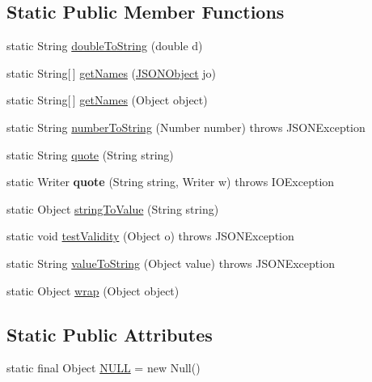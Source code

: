 \subsection*{Static Public Member Functions}
\begin{DoxyCompactItemize}
\item 
static String \hyperlink{classorg_1_1json_1_1JSONObject_aad3ea50c3546331486737bcb24e42460}{double\-To\-String} (double d)
\item 
static String\mbox{[}$\,$\mbox{]} \hyperlink{classorg_1_1json_1_1JSONObject_a30d4e44e4c8e03341c346970a00ba283}{get\-Names} (\hyperlink{classorg_1_1json_1_1JSONObject}{J\-S\-O\-N\-Object} jo)
\item 
static String\mbox{[}$\,$\mbox{]} \hyperlink{classorg_1_1json_1_1JSONObject_acf2ec104b4cbbf2947b155d54047efe8}{get\-Names} (Object object)
\item 
static String \hyperlink{classorg_1_1json_1_1JSONObject_a5ea1eb29e2e3bdc7b4fae0579ead8525}{number\-To\-String} (Number number)  throws J\-S\-O\-N\-Exception 
\item 
static String \hyperlink{classorg_1_1json_1_1JSONObject_abe60222a3919d3f88f104486c1ef13fe}{quote} (String string)
\item 
\hypertarget{classorg_1_1json_1_1JSONObject_aac3d22e558d472049d4c8702cdaf676a}{static Writer {\bfseries quote} (String string, Writer w)  throws I\-O\-Exception }\label{classorg_1_1json_1_1JSONObject_aac3d22e558d472049d4c8702cdaf676a}

\item 
static Object \hyperlink{classorg_1_1json_1_1JSONObject_a23f861897abe58eb41c044dd63667319}{string\-To\-Value} (String string)
\item 
static void \hyperlink{classorg_1_1json_1_1JSONObject_a406920be130176bad74d605bae04a6da}{test\-Validity} (Object o)  throws J\-S\-O\-N\-Exception 
\item 
static String \hyperlink{classorg_1_1json_1_1JSONObject_ab386b6f594205eecdbe023ad7cb26105}{value\-To\-String} (Object value)  throws J\-S\-O\-N\-Exception 
\item 
static Object \hyperlink{classorg_1_1json_1_1JSONObject_a5aa793d5ebe4bb6002bd37d84d65742e}{wrap} (Object object)
\end{DoxyCompactItemize}
\subsection*{Static Public Attributes}
\begin{DoxyCompactItemize}
\item 
static final Object \hyperlink{classorg_1_1json_1_1JSONObject_a01c74a31a1abfd34ab13beb9347855ac}{N\-U\-L\-L} = new Null()
\end{DoxyCompactItemize}
